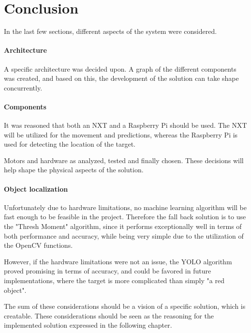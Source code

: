 \section{Conclusion}
In the last few sections, different aspects of the system were considered.

\paragraph{Architecture}
A specific architecture was decided upon.
A graph of the different components was created, and based on this, the development of the solution can take shape concurrently.


\paragraph{Components}
It was reasoned that both an NXT and a Raspberry Pi should be used.
The NXT will be utilized for the movement and predictions, whereas the Raspberry Pi is used for detecting the location of the target.


Motors and hardware as analyzed, tested and finally chosen.
These decisions will help shape the physical aspects of the solution.


\paragraph{Object localization}
Unfortunately due to hardware limitations, no machine learning algorithm will be fast enough to be feasible in the project.
Therefore the fall back solution is to use the "Thresh Moment" algorithm, since it performs exceptionally well in terms of both performance and accuracy, while being very simple due to the utilization of the OpenCV functions.

However, if the hardware limitations were not an issue, the YOLO algorithm proved promising in terms of accuracy, and could be favored in future implementations, where the target is more complicated than simply "a red object".

The sum of these considerations should be a vision of a specific solution, which is creatable.
These considerations should be seen as the reasoning for the implemented solution expressed in the following chapter.
